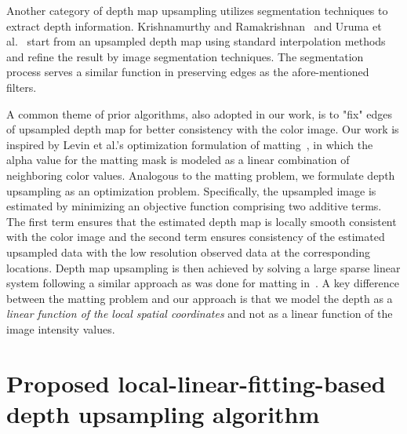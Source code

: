 Another category of depth map upsampling utilizes segmentation techniques to extract depth information. Krishnamurthy and Ramakrishnan~\cite{krishnamurthy2016image} and Uruma et al.~\cite{uruma2016high} start from an upsampled depth map using standard interpolation methods and refine the result by image segmentation techniques. The segmentation process serves a similar function in preserving edges as the afore-mentioned filters.

A common theme of prior algorithms, also adopted in our work, is to "fix" edges of upsampled depth map for better consistency with the color image.
Our work is inspired by Levin et al.'s optimization formulation of matting~\cite{levin2008closed}, in which the alpha value for the matting mask is modeled as a linear combination of neighboring color values. Analogous to the matting problem, we formulate depth upsampling as an optimization problem. Specifically, the upsampled image is estimated by minimizing an objective function comprising two additive terms. The first term ensures that the estimated depth map is locally smooth consistent with the color image and the second term ensures consistency of the estimated upsampled data with the low resolution observed data at the corresponding locations. Depth map upsampling is then achieved by solving a large sparse linear system following a similar approach as was done for matting in~\cite{levin2008closed}. A key difference between the matting problem and our approach is that we model the depth as a {\em linear function of the local spatial coordinates} and not as a linear function of the image intensity values.

\section{Proposed local-linear-fitting-based depth upsampling algorithm}
\label{sec:2.algo}
